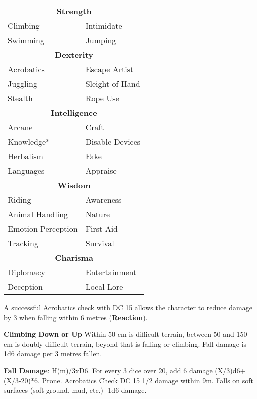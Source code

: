 \documentclass[landscape,10pt,a4paper]{article}
\begin{document}
\begin{multicols}{3}
\begin{dmbox}[title=Skills - page \pageref{skillslist}]
\begin{tabularx}{0.95\linewidth}{ll}
\multicolumn{2}{c}{\textbf{Strength}}\\
Climbing & Intimidate\\
Swimming & Jumping\\
\multicolumn{2}{c}{\textbf{Dexterity}}\\
Acrobatics & Escape Artist\\
Juggling & Sleight of Hand\\
Stealth & Rope Use\\
\multicolumn{2}{c}{\textbf{Intelligence}}\\
Arcane & Craft\\
Knowledge*&Disable Devices\\
Herbalism&Fake\\
Languages&Appraise\\
\multicolumn{2}{c}{\textbf{Wisdom}}\\
Riding & Awareness\\
Animal Handling & Nature\\
Emotion Perception & First Aid\\
Tracking & Survival\\
\multicolumn{2}{c}{\textbf{Charisma}}\\
Diplomacy & Entertainment\\
Deception & Local Lore
\end{tabularx}
\end{dmbox}


\begin{dmbox}[title=Acrobatics - page \pageref{acrobatics}]
A successful Acrobatics check with DC 15 allows the character to reduce damage by 3 when falling within 6 metres (\textbf{Reaction}).

\textbf{Climbing Down or Up} Within 50 cm is difficult terrain, between 50 and 150 cm is doubly difficult terrain, beyond that is falling or climbing. Fall damage is 1d6 damage per 3 metres fallen. 

\textbf{Fall Damage}: H(m)/3xD6. For every 3 dice over 20, add 6 damage (X/3)d6+(X/3-20)*6. Prone. Acrobatics Check DC 15 1/2 damage within 9m. Falls on soft surfaces (soft ground, mud, etc.) -1d6 damage.
\end{dmbox}

\begin{dmbox}[title=Climbing/Climbing - page \pageref{climbing}]


\end{dmbox}
\end{multicols}
\end{document}
